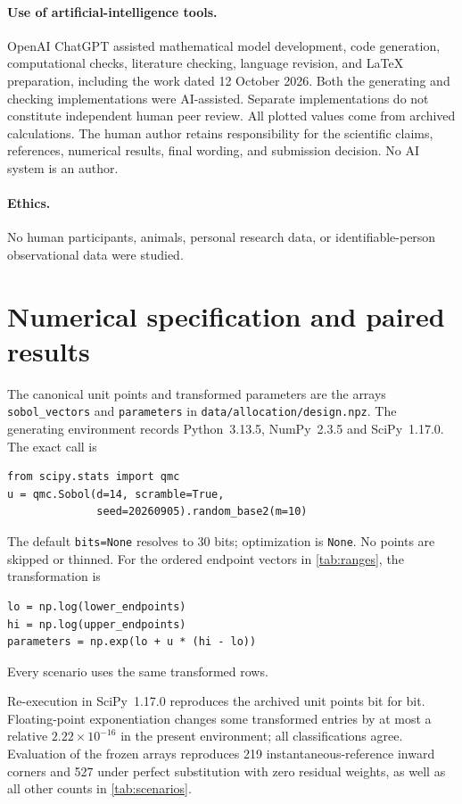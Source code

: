 \documentclass[11pt,a4paper]{article}
\theoremstyle{definition}\newtheorem{definition}{Definition}
\begin{document}
\paragraph{Use of artificial-intelligence tools.} OpenAI ChatGPT assisted mathematical model development, code generation, computational checks, literature checking, language revision, and LaTeX preparation, including the work dated 12 October 2026. Both the generating and checking implementations were AI-assisted. Separate implementations do not constitute independent human peer review. All plotted values come from archived calculations. The human author retains responsibility for the scientific claims, references, numerical results, final wording, and submission decision. No AI system is an author.

\paragraph{Ethics.} No human participants, animals, personal research data, or identifiable-person observational data were studied.

\appendix
\section{Numerical specification and paired results}
\label{app:numerical}

The canonical unit points and transformed parameters are the arrays
\texttt{sobol\_vectors} and \texttt{parameters} in
\texttt{data/allocation/design.npz}. The generating environment records
Python~3.13.5, NumPy~2.3.5 and SciPy~1.17.0. The exact call is
\begin{verbatim}
from scipy.stats import qmc
u = qmc.Sobol(d=14, scramble=True,
              seed=20260905).random_base2(m=10)
\end{verbatim}
The default \texttt{bits=None} resolves to 30 bits; optimization is
\texttt{None}. No points are skipped or thinned. For the ordered endpoint
vectors in \cref{tab:ranges}, the transformation is
\begin{verbatim}
lo = np.log(lower_endpoints)
hi = np.log(upper_endpoints)
parameters = np.exp(lo + u * (hi - lo))
\end{verbatim}
Every scenario uses the same transformed rows.

Re-execution in SciPy~1.17.0 reproduces the archived unit points bit for
bit. Floating-point exponentiation changes some transformed entries by
at most a relative $2.22\times10^{-16}$ in the present environment;
all classifications agree. Evaluation of the frozen arrays reproduces
219 instantaneous-reference inward corners and 527 under perfect
substitution with zero residual weights, as well as all other counts
in \cref{tab:scenarios}.
\end{document}
